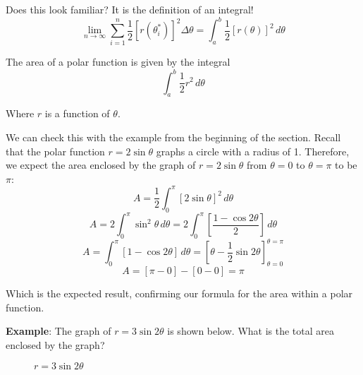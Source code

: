 Does this look familiar? It is the definition of an integral!
$$\lim_{n \to \infty} \sum_{i = 1}^n \frac{1}{2} \left[ r( \theta_i^*) \right] 
^2 \Delta \theta = \int_a^b \frac{1}{2} \left[ r(\theta) \right]^2\,d\theta$$

\begin{mdframed}[style=important, frametitle={Area of a Polar Function}]
The area of a polar function is given by the integral 
$$\int_a^b \frac{1}{2} r^2\,d\theta$$

Where $r$ is a function of $\theta$. 
\end{mdframed}

We can check this with the example from the beginning of the section. Recall 
that the polar function $r =  2\sin{\theta}$ graphs a circle with a radius of 
1. Therefore, we expect the area enclosed by the graph of $r = 2\sin{\theta}$ 
from $\theta = 0$ to $\theta = \pi$ to be $\pi$:
$$A = \frac{1}{2} \int_0^{\pi} \left[ 2\sin{\theta} \right]^2\,d\theta$$
$$A = 2 \int_0^{\pi} \sin^2{\theta}\,d\theta = 2 \int_0^{\pi} \left[ \frac{1 - 
\cos{2\theta}}{2} \right]\,d\theta$$
$$A = \int_0^{\pi} \left[ 1 - \cos{2\theta} \right]\,d\theta = \left[\theta - 
\frac{1}{2}\sin{2\theta} \right]_{\theta = 0}^{\theta = \pi}$$
$$A = \left[\pi - 0 \right] - \left[0 - 0 \right] = \pi$$

Which is the expected result, confirming our formula for the area within a 
polar function. 

\textbf{Example}: The graph of $r = 3\sin{2\theta}$ is shown below. What is 
the total area enclosed by the graph?

\begin{figure}[htbp]
\centering
    \caption{$r = 3\sin{2\theta}$}
    \label{fig:fourlobe}
\end{figure}


